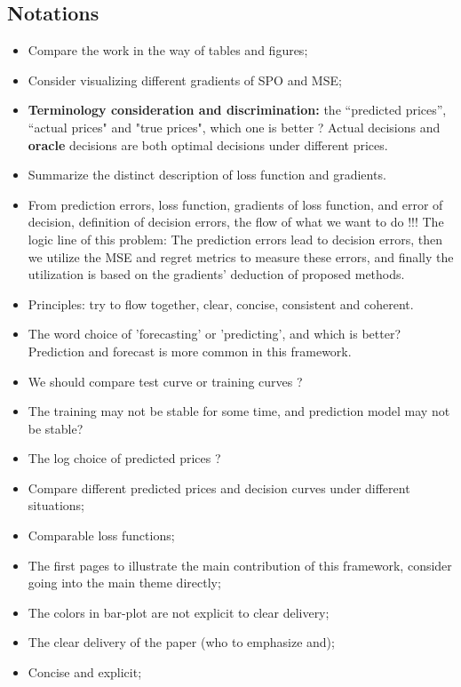 \documentclass[journal]{IEEEtran}
\newcommand{\slw}{\color{blue}}
\begin{document}
\subsection*{Notations}
\begin{itemize}
  \item Compare the work in the way of tables and figures;
  \item Consider {\slw visualizing different gradients of SPO and MSE};
  \item \textbf{Terminology consideration and discrimination:} the {\slw ``predicted prices'', ``actual prices" and "true prices"}, which one is better ? {\slw Actual decisions and \textbf{oracle } decisions are both optimal decisions under different prices.}
  \item Summarize the distinct description of loss function and gradients.
  \item From prediction errors, loss function, gradients of loss function, and error of decision, definition of decision errors, the flow of what we want to do !!! {\slw The logic line of this problem: The prediction errors lead to decision errors, then we utilize the MSE and regret metrics to measure these errors, and finally the utilization is based on the gradients' deduction of proposed methods.}
  \item {\slw Principles: try to flow together, clear, concise, consistent and coherent}. 
  \item The word choice of 'forecasting' or 'predicting', and which is better? {\slw Prediction and forecast is more common in this framework.}
  \item We should compare test curve or training curves ?
  \item The training may not be stable for some time, and prediction model may not be stable?
  \item The log choice of predicted prices ?
  \item Compare different predicted prices and decision curves under different situations;
  \item {\slw Comparable loss functions};
  \item The first pages to illustrate the main contribution of this framework, {\slw consider going into the main theme directly};
  \item The colors in bar-plot are not explicit to clear delivery;
  \item The clear delivery of the paper (who to emphasize and);
  \item Concise and explicit;

\end{itemize}
\end{document}
